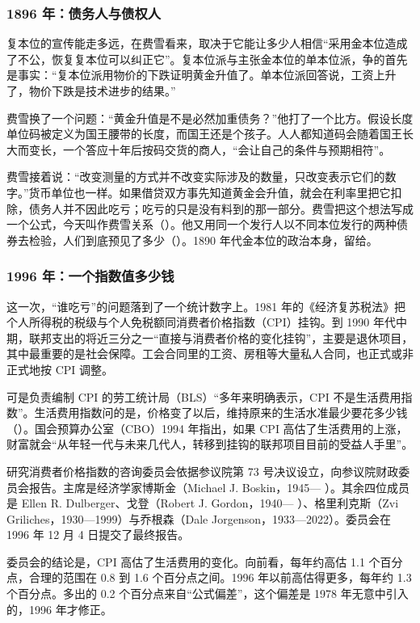 \subsubsection{1896 年：债务人与债权人}
复本位的宣传能走多远，在费雪看来，取决于它能让多少人相信“采用金本位造成了不公，恢复复本位可以纠正它”。复本位派与主张金本位的单本位派，争的首先是事实：“复本位派用物价的下跌证明黄金升值了。单本位派回答说，工资上升了，物价下跌是技术进步的结果。”\cite{fisher1896}

费雪换了一个问题：“黄金升值是不是必然加重债务？”他打了一个比方。假设长度单位码被定义为国王腰带的长度，而国王还是个孩子。人人都知道码会随着国王长大而变长，一个答应十年后按码交货的商人，“会让自己的条件与预期相符”。

费雪接着说：“改变测量的方式并不改变实际涉及的数量，只改变表示它们的数字。”\cite{fisher1896}货币单位也一样。如果借贷双方事先知道黄金会升值，就会在利率里把它扣除，债务人并不因此吃亏；吃亏的只是没有料到的那一部分。费雪把这个想法写成一个公式，今天叫作费雪关系（）。他又用同一个发行人以不同本位发行的两种债券去检验，人们到底预见了多少（）。1890 年代金本位的政治本身，留给。

\subsubsection{1996 年：一个指数值多少钱}
这一次，“谁吃亏”的问题落到了一个统计数字上。1981 年的《经济复苏税法》把个人所得税的税级与个人免税额同消费者价格指数（CPI）挂钩\cite{boskin1996}。到 1990 年代中期，联邦支出的将近三分之一“直接与消费者价格的变化挂钩”，主要是退休项目，其中最重要的是社会保障。工会合同里的工资、房租等大量私人合同，也正式或非正式地按 CPI 调整\cite{boskin1996}。

可是负责编制 CPI 的劳工统计局（BLS）“多年来明确表示，CPI 不是生活费用指数”\cite{boskin1996}。生活费用指数问的是，价格变了以后，维持原来的生活水准最少要花多少钱（）。国会预算办公室（CBO）1994 年指出，如果 CPI 高估了生活费用的上涨，财富就会“从年轻一代与未来几代人，转移到挂钩的联邦项目目前的受益人手里”\cite{boskin1996}。

研究消费者价格指数的咨询委员会依据参议院第 73 号决议设立，向参议院财政委员会报告。主席是经济学家博斯金（Michael J. Boskin，1945— ）。其余四位成员是 Ellen R. Dulberger、戈登（Robert J. Gordon，1940— ）、格里利克斯（Zvi Griliches，1930—1999）与乔根森（Dale Jorgenson，1933—2022）。委员会在 1996 年 12 月 4 日提交了最终报告\cite{boskin1996}。

委员会的结论是，CPI 高估了生活费用的变化。向前看，每年约高估 1.1 个百分点，合理的范围在 0.8 到 1.6 个百分点之间。1996 年以前高估得更多，每年约 1.3 个百分点。多出的 0.2 个百分点来自“公式偏差”，这个偏差是 1978 年无意中引入的，1996 年才修正\cite{boskin1996}。

